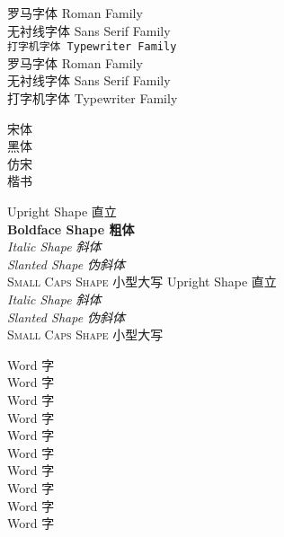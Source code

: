 \documentclass[UTF8]{article}
\begin{document}
	\textrm{罗马字体 Roman Family}\\
	\textsf{无衬线字体 Sans Serif Family}\\
	\texttt{打字机字体 Typewriter Family}\\
	{\rmfamily 罗马字体 Roman Family}\\
	{\sffamily 无衬线字体 Sans Serif Family}\\
	{\ttfamily 打字机字体 Typewriter Family}
	
	
	{\songti 宋体}\\
	{\heiti 黑体}\\
	{\fangsong 仿宋}\\
	{\kaishu 楷书}
	
	
	\textup{Upright Shape 直立}\\
	\textbf{Boldface Shape 粗体}\\
	\textit{Italic Shape 斜体}\\
	\textsl{Slanted Shape 伪斜体}\\
	\textsc{Small Caps Shape 小型大写}
	{\upshape Upright Shape 直立}\\
	{\itshape Italic Shape 斜体}\\
	{\slshape Slanted Shape 伪斜体}\\
	{\scshape Small Caps Shape 小型大写}
	
	
	{\tiny Word 字}\\
	{\scriptsize Word 字}\\
	{\footnotesize Word 字}\\
	{\small Word 字}\\
	{\normalsize Word 字}\\
	{\large Word 字}\\
	{\Large Word 字}\\
	{\LARGE Word 字}\\
	{\huge Word 字}\\
	{\Huge Word 字}
\end{document}
